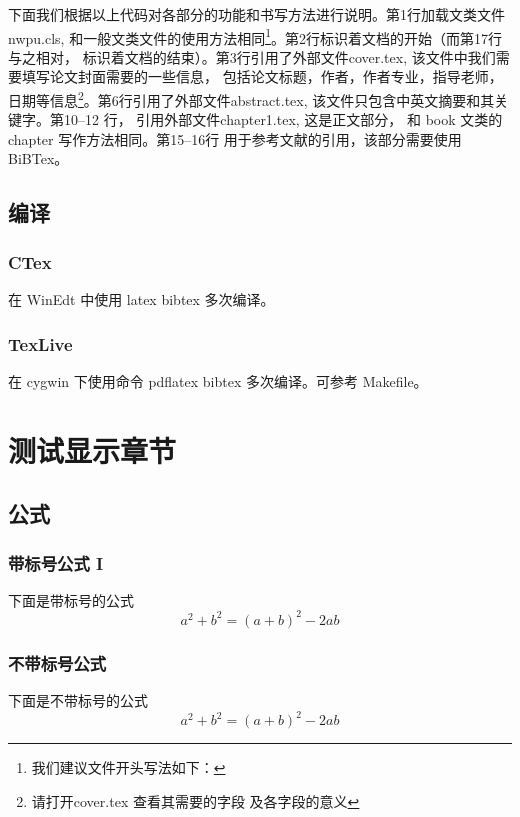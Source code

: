 \documentclass{nwpu}
\begin{document}
                \par
                \vskip 20pt
            下面我们根据以上代码对各部分的功能和书写方法进行说明。第1行加载文类文件nwpu.cls, 
            和一般文类文件的使用方法相同\footnote{我们建议文件开头写法如下：
            }。第2行标识着文档的开始（而第17行与之相对， 
            标识着文档的结束）。第3行引用了外部文件cover.tex, 该文件中我们需要填写论文封面需要的一些信息，
            包括论文标题，作者，作者专业，指导老师，日期等信息\footnote{请打开cover.tex 查看其需要的字段
            及各字段的意义}。第6行引用了外部文件abstract.tex, 该文件只包含中英文摘要和其关键字。第10--12
            行， 引用外部文件chapter1.tex, 这是正文部分， 和 book 文类的 chapter 写作方法相同。第15--16行
            用于参考文献的引用，该部分需要使用BiBTex。\cite{LatexCompanion}
        \section{编译}
            \subsection{CTex}
                在 WinEdt 中使用 latex bibtex 多次编译。
            
            \subsection{TexLive}
                在 cygwin 下使用命令 pdflatex bibtex 多次编译。可参考 Makefile。

    \chapter{测试显示章节}
        \section{公式}
            \subsection{带标号公式 I}
                下面是带标号的公式
                \begin{equation} 
                    a^2 + b^2 = (a + b)^2 -2ab
                \end{equation}
            \subsection{不带标号公式}
                下面是不带标号的公式
                \begin{equation*} 
                    a^2 + b^2 = (a + b)^2 -2ab
                \end{equation*}
\end{document}
